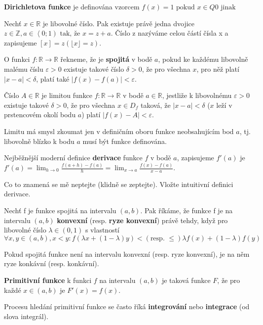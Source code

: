 \begin{definition}
  \textbf{Dirichletova funkce} je definována vzorcem
  $f(x) = 1 \text{ pokud } x \in Q
         0 \text{ jinak }$
\end{definition}

\begin{definition}
  Nechť $x \in \mathbb{R}$ je libovolné číslo. Pak existuje právě jedna dvojice $z \in \mathbb{Z}, a \in \left \langle 0;1 \right) \text{ tak, že } x = z + a$.
Číslo z nazýváme celou částí čísla x a zapisujeme $[x] = z (\lfloor x \rfloor = z)$.
\end{definition}

\begin{definition}
  O funkci $f:\mathbb {R} \rightarrow \mathbb {R}$ řekneme, že je \textbf{spojitá} v bodě $a$, pokud ke každému libovolně malému číslu $\varepsilon >0$ existuje takové číslo $\delta >0$, že pro všechna $x$, pro něž platí $|x-a|<\delta$, platí také $|f(x)-f(a)|<\varepsilon$.
\end{definition}

\begin{definition}
  Číslo $A\in \mathbb {R}$ je limitou funkce $f:\mathbb {R} \rightarrow \mathbb {R}$ v bodě $ a\in \mathbb {R}$, jestliže k libovolnému $ \varepsilon >0$ existuje takové $ \delta >0$, že pro všechna $x\in D_{f}$ taková, že $ \left|x-a\right|<\delta$ ($x$ leží v prstencovém okolí bodu $a$) platí $\left|f(x)-A\right|<\varepsilon $.

  Limitu má smysl zkoumat jen v definičním oboru funkce neobsahujícím bod $a$, tj. libovolně blízko k bodu $a$ musí být funkce definována.
\end{definition}

\begin{definition}
  Nejběžnější moderní definice \textbf{derivace} funkce $f$ v bodě $a$, zapisujeme $f'(a)$ je $f'(a)=\lim _{h\to 0}{\frac {f(a+h)-f(a)}{h}}=\lim _{x\to a}{\frac {f(x)-f(a)}{x-a}}$.

  Co to znamená se mě neptejte (klidně se zeptejte). Vložte intuitivní definici derivace.
\end{definition}

\begin{definition}
  Nechť f je funkce spojitá na intervalu $(a,b)$. Pak říkáme, že funkce f je na intervalu $(a,b)$ \textbf{konvexní} (resp. \textbf{ryze konvexní}) právě tehdy, když pro libovolné číslo $\lambda \in (0,1)$ s vlastností $\forall x,y\in (a,b),x<y:f(\lambda x+(1-\lambda )y) < (\text{resp. } \leq) \lambda f(x)+(1-\lambda )f(y)$

  Pokud spojitá funkce není na intervalu konvexní (resp. ryze konvexní), je na něm ryze konkávní (resp. konkávní).
\end{definition}

\begin{definition}
  \textbf{Primitivní funkce} k funkci $f$ na intervalu $(a,b)$ je taková funkce $F$, že pro každé $x\in (a,b)$ je $F'(x)=f(x)$.

  Procesu hledání primitivní funkce se často říká \textbf{integrování} nebo \textbf{integrace} (od slova integrál).
\end{definition}
